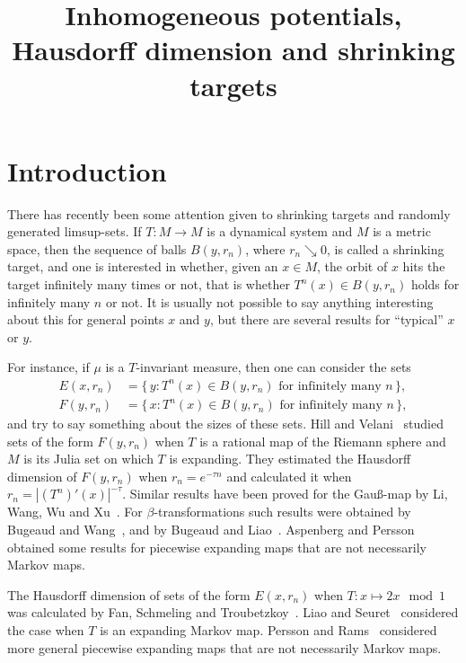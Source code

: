 \documentclass[AHL,Unicode,longabstracts]{cedram}
\title[Inhomogeneous potentials, Hausdorff dimension and shrinking targets]{Inhomogeneous potentials, Hausdorff dimension and shrinking targets}
\author[\initial{T.} \lastname{Persson}]{\firstname{Tomas} \lastname{Persson}}
\begin{document}
\maketitle

\section{Introduction}

There has recently been some attention given to shrinking targets and randomly generated limsup-sets. If $T \colon M \to M$ is a dynamical system and $M$ is a metric space, then the sequence of balls $B(y,r_n)$, where $r_n \searrow 0$, is called a shrinking target, and one is interested in whether, given an $x \in M$, the orbit of $x$ hits the target infinitely many times or not, that is whether $T^n(x)
\in B(y,r_n)$ holds for infinitely many $n$ or not. It is usually not possible to say anything interesting about this for general points $x$ and $y$, but there are several results for ``typical'' $x$ or $y$.

For instance, if $\mu$ is a $T$-invariant measure, then one can consider the sets
\begin{align*}
E (x,r_n) &= \{\, y : T^n (x) \in B(y,r_n) \text{ for infinitely many } n \,\},\\ F (y,r_n) &= \{\, x : T^n (x) \in B(y,r_n) \text{ for infinitely many } n \,\},
\end{align*}
and try to say something about the sizes of these sets. Hill and Velani~\cite{hillvelani} studied sets of the form $F(y, r_n)$ when $T$ is a rational map of the Riemann sphere and $M$ is its Julia set on which $T$ is expanding. They estimated the Hausdorff dimension of $F(y,r_n)$ when $r_n = e^{-\tau n}$ and calculated it when $r_n = |(T^n)' (x)|^{-\tau}$. Similar results have been proved for the Gau\ss-map by Li, Wang, Wu and Xu~\cite{liwangwuxu}. For $\beta$-transformations such results were obtained by Bugeaud and Wang~\cite{bugeaudwang}, and by Bugeaud and Liao~\cite{bugeaudliao}. Aspenberg and Persson~\cite{aspenbergpersson} obtained some results for piecewise expanding maps that are not necessarily Markov maps.

The Hausdorff dimension of sets of the form $E(x,r_n)$ when $T \colon x \mapsto 2x \mod 1$ was calculated by Fan, Schmeling and Troubetzkoy~\cite{fanschmelingtroubetzkoy}. Liao and Seuret~\cite{liaoseuret} considered the case when $T$ is an expanding Markov map. Persson and Rams~\cite{perssonrams} considered more general piecewise expanding maps that are not necessarily Markov maps.
\end{document}

